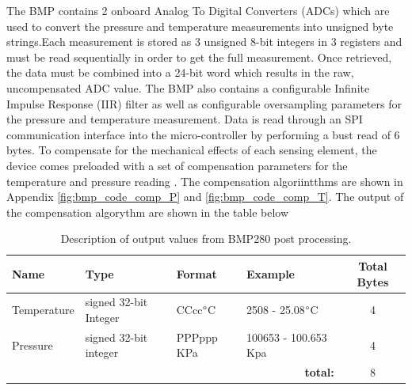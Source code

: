 The BMP contains 2 onboard Analog To Digital Converters (ADCs) which are used to convert the pressure and temperature measurements into unsigned byte strings.Each measurement is stored as 3 unsigned 8-bit integers in 3 registers and must be read sequentially in order to get the full measurement. Once retrieved, the data must be combined into a 24-bit word which results in the raw, uncompensated ADC value. The BMP also contains a configurable Infinite Impulse Response (IIR) filter as well as configurable oversampling parameters for the pressure and temperature measurement. Data is read through an SPI communication interface into the micro-controller by performing a bust read of 6 bytes. To compensate for the mechanical effects of each sensing element, the device comes preloaded with a set of compensation parameters for the temperature and pressure reading \cite{BMP280_Datasheet}. The compensation algoriintthms are shown in Appendix \ref{fig:bmp_code_comp_P} and \ref{fig:bmp_code_comp_T}. The output of the compensation algorythm are shown in the table below

\begin{table}[H]
	\centering
	\caption{Description of output values from BMP280 post processing.}
	\begin{tabular}{|l|l|l|l|c|}
		\hline
		\textbf{Name }& \textbf{Type} &\textbf{Format} & \textbf{Example} & \textbf{Total Bytes}   \\
		\hline
		Temperature & signed 32-bit Integer & CCcc$\degree$C & 2508 - 25.08$\degree$C & 4\\
		\hline
		Pressure & signed 32-bit integer & PPPppp KPa & 100653 - 100.653 Kpa & 4\\
		\hline
		\multicolumn{4}{r}{\textbf{total:}} & \multicolumn{1}{c}{8}\\
		\cline{5-5}
		\cline{5-5}
	\end{tabular}
	
	\label{tab:BMP_output}
\end{table}

